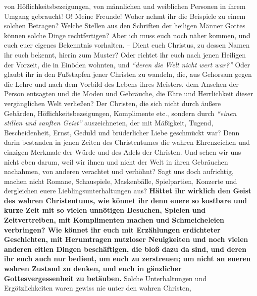 von Höflichkeitsbezeigungen, von männlichen und weiblichen Personen in ihrem
Umgang gebraucht! O! Meine Freunde! Woher nehmt ihr die Beispiele zu einem
solchen Betragen? Welche Stellen aus den Schriften der heiligen Männer Gottes
können solche Dinge rechtfertigen? Aber ich muss euch noch näher kommen, und
euch
euer eigenes Bekenntnis vorhalten. -- Dient euch Christus, zu dessen Namen ihr
euch bekennt, hierin zum Muster? Oder richtet ihr euch
nach jenen Heiligen der
Vorzeit, die in Einöden wohnten, und
\textit{"`deren die Welt nicht wert war?"'}
Oder glaubt ihr in den Fußstapfen jener Christen zu
wandeln, die, aus Gehorsam gegen die Lehre und nach dem Vorbild des Lebens
ihres Meisters, dem Ansehen der Person entsagten und die Moden und Gebräuche,
die Ehre und Herrlichkeit dieser vergänglichen Welt verließen? Der Christen, die
sich nicht durch äußere Gebärden, Höflichkeitsbezeigungen, Komplimente etc.,
sondern durch
\textit{"`einen stillen und sanften Geist"'}
auszeichneten, der mit Mäßigkeit, Tugend,
Bescheidenheit, Ernst, Geduld und
brüderlicher Liebe geschmückt war? Denn darin bestanden in jenen Zeiten des
Christentumes die wahren Ehrenzeichen und einzigen Merkmale der Würde und des
Adels der Christen. Und sehen wir uns nicht eben darum, weil wir ihnen und nicht
der Welt in ihren Gebräuchen nachahmen, von anderen verachtet und verhöhnt? Sagt
uns doch aufrichtig, machen nicht Romane,
Schauspiele, Maskenbälle,
Spielpartien, Konzerte und dergleichen euere
Lieblingsunterhaltungen aus? \label{ref:10_08_zeitvertreib} \textbf{Hättet ihr
wirklich den Geist des wahren Christentums, wie
könnet ihr denn euere so
kostbare und kurze Zeit mit so vielen unnötigen Besuchen,
Spielen und
Zeitvertreiben, mit Komplimenten machen und Schmeicheleien
verbringen? Wie
könnet ihr euch mit Erzählungen erdichteter
Geschichten, mit Herumtragen
nutzloser Neuigkeiten und noch vielen anderen
eitlen
Dingen beschäftigen, die
bloß dazu da sind, und deren ihr euch auch nur bedient, um euch zu
zerstreuen;
um nicht an eueren wahren Zustand zu denken, und euch in gänzlicher
Gottesvergessenheit zu
betäuben.} Solche Unterhaltungen und Ergötzlichkeiten
waren gewiss nie unter den wahren Christen,
